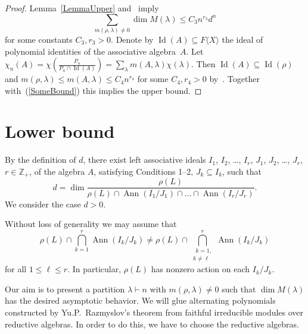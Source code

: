 \documentclass[12pt, reqno, a4paper]{amsart}
\theoremstyle{plain}
\theoremstyle{remark}
\theoremstyle{definition}
\begin{document}
\begin{proof}
Lemma~\ref{LemmaUpper} and~\cite[Lemmas~6.2.4, 6.2.5]{ZaiGia}
imply
\begin{equation}\label{SomeBound}
\sum_{m(\rho, \lambda)\ne 0} \dim M(\lambda) \leqslant C_3 n^{r_3} d^n
\end{equation}
for some constants $C_3, r_3 > 0$.
Denote by $\operatorname{Id}(A) \subseteq F\langle X \rangle$ the ideal of polynomial identities of the associative
algebra~$A$. Let $\chi_n(A)=\chi\left(\frac{P_n}{P_n \cap \operatorname{Id}(A)}\right)
= \sum_{\lambda} m(A, \lambda) \chi(\lambda)$.
Then $\operatorname{Id}(A) \subseteq \operatorname{Id}(\rho)$ and $m(\rho, \lambda) \leqslant m(A, \lambda)
\leqslant C_4 n^{r_4}$ for some $C_4, r_4 > 0$ by~\cite[Lemma~4.9.2]{ZaiGia}.
Together with~(\ref{SomeBound}) this implies the upper bound.
\end{proof}

\section{Lower bound}

By the definition of $d$, there exist left associative ideals $I_1$, $I_2$, \ldots, $I_r$,
$J_1$, $J_2$, \ldots, $J_r$, $r \in \mathbb Z_+$, of the algebra $A$,
satisfying Conditions 1--2, $J_k \subseteq I_k$, such that
$$d = \dim \frac{\rho(L)}{\rho(L) \cap \operatorname{Ann}(I_1/J_1) \cap \dots \cap \operatorname{Ann}(I_r/J_r)}.$$
We consider the case $d > 0$.

Without loss of generality we may assume that
$$\rho(L) \cap \bigcap\limits_{k=1}^r \operatorname{Ann}(I_k/J_k) \ne
\rho(L) \cap \bigcap\limits_{\substack{\phantom{,}k=1,\\ k\ne\ell}}^r \operatorname{Ann}(I_k/J_k)$$
for all $1 \leqslant \ell \leqslant r$.
In particular, $\rho(L)$ has nonzero action on each $I_k/J_k$.

Our aim is to present a partition $\lambda \vdash n$
with $m(\rho, \lambda)\ne 0$ such that $\dim M(\lambda)$
has the desired asymptotic behavior.
We will glue alternating polynomials constructed
by Yu.P.~Razmyslov's theorem
from faithful irreducible modules
over reductive algebras. In order to do this,
we have to choose the reductive algebras.
\end{document}
